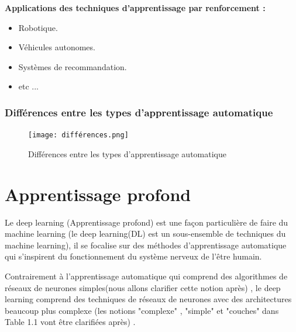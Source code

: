 \textbf{Applications des techniques d'apprentissage par renforcement \cite{basics_of_reinforcement_learning}:}
\begin{itemize}[label={*}]
\item Robotique.
\item Véhicules autonomes.
\item Systèmes de recommandation.
\item etc ...
\end{itemize}


\newpage

\subsubsection{Différences entre les types d'apprentissage automatique} 
 \begin{figure}[htbp]
     \centering    
     \texttt{[image: différences.png]}
     \caption{Différences entre les types d'apprentissage automatique \cite{reinforcement_learning}}
     \label{fig:example9}
     \end{figure}

 \vspace{3cm}    
 \section{Apprentissage profond}
  Le deep learning (Apprentissage profond) est une façon particulière de faire du machine learning (le deep learning(DL) est un sous-ensemble de techniques du machine learning), il se focalise sur des méthodes d'apprentissage automatique qui s'inspirent du fonctionnement du système nerveux de l'être humain.
 
 Contrairement à l'apprentissage automatique qui comprend des algorithmes de réseaux de neurones simples(nous allons clarifier cette notion après) , le deep learning comprend des techniques de réseaux de neurones avec des architectures beaucoup plus complexe (les notions "complexe" , "simple" et "couches" dans Table 1.1 vont être clarifiées après) .
 

